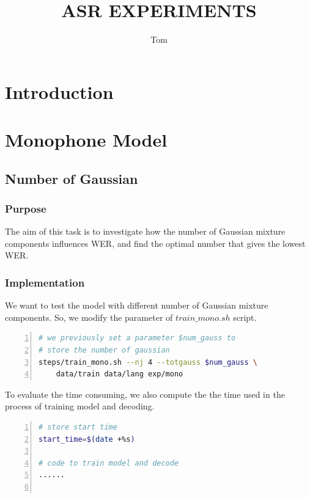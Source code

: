 \documentclass[]{article}
\begin{document}
\begin{multicols*}{2}
\title{ASR EXPERIMENTS}
\author{Tom}
\maketitle

\section{Introduction}

\section{Monophone Model}
\subsection{Number of Gaussian}
\subsubsection{Purpose}
The aim of this task is to investigate how the number of Gaussian mixture components influences WER, and find the optimal number that gives the lowest WER. 

\subsubsection{Implementation}
We want to test the model with different number of Gaussian mixture components. So, we modify the parameter of $train\_mono.sh$ script.

\begin{lstlisting}[language=sh,showstringspaces=false,numbers=left,tabsize=4, xleftmargin=\parindent, frame=single, basicstyle=\tiny] 
# we previously set a parameter $num_gauss to
# store the number of gaussian 
steps/train_mono.sh --nj 4 --totgauss $num_gauss \
	data/train data/lang exp/mono

\end{lstlisting}

To evaluate the time consuming, we also compute the the time used in the process of training model and decoding.

\begin{lstlisting}[language=sh,showstringspaces=false,numbers=left,tabsize=4, xleftmargin=\parindent, frame=single, basicstyle=\tiny] 
# store start time
start_time=$(date +%s)

# code to train model and decode
......


\end{lstlisting}
\end{multicols*}
\end{document}
